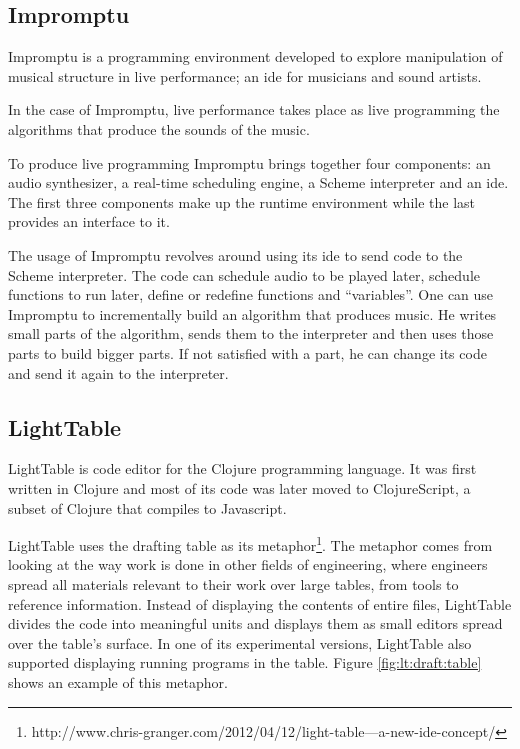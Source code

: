 \documentclass{./llncs2e/llncs}
\begin{document}
\subsection{Impromptu\cite{sorensen2005impromptu}\cite{sorensen2010programming}}
	Impromptu is a programming environment developed to explore manipulation of musical structure in live performance; an \ac{ide} for musicians and sound artists.

	In the case of Impromptu, live performance takes place as live programming the algorithms that produce the sounds of the music.

	To produce live programming Impromptu brings together four components: an audio synthesizer, a real-time scheduling engine, a Scheme interpreter and an \ac{ide}. The first three components make up the runtime environment while the last provides an interface to it. 

	The usage of Impromptu revolves around using its \ac{ide} to send code to the Scheme interpreter. The code can schedule audio to be played later, schedule functions to run later, define or redefine functions and ``variables''. 
	One can use Impromptu to incrementally build an algorithm that produces music. He writes small parts of the algorithm, sends them to the interpreter and then uses those parts to build bigger parts. If not satisfied with a part, he can change its code and send it again to the interpreter.


\subsection{LightTable}
	LightTable is code editor for the Clojure programming language\cite{hickey2008clojure}. It was first written in Clojure and most of its code was later moved to ClojureScript\cite{10.1109/MIC.2011.148}, a subset of Clojure that compiles to Javascript.

	LightTable uses the drafting table as its metaphor\footnote{http://www.chris-granger.com/2012/04/12/light-table---a-new-ide-concept/}. The metaphor comes from looking at the way work is done in other fields of engineering, where engineers spread all materials relevant to their work over large tables, from tools to reference information. 
	Instead of displaying the contents of entire files, LightTable divides the code into meaningful units and displays them as small editors spread over the table's surface. In one of its experimental versions, LightTable also supported displaying running programs in the table. Figure \ref{fig:lt:draft:table} shows an example of this metaphor.
\end{document}

